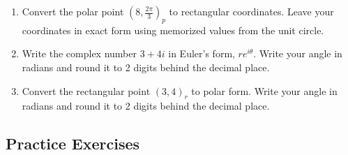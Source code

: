 \begin{myPrep}
	\begin{enumerate}
		\item Convert the polar point $\left(8,\frac{2\pi}{3}\right)_p$ to rectangular coordinates. Leave your coordinates in exact form using memorized values from the unit circle.
		\vfill
		\item Write the complex number $3+4i$ in Euler's form, $re^{i\theta}$. Write your angle in radians and round it to 2 digits behind the decimal place.
		\vfill
		\item Convert the rectangular point $(3,4)_r$ to polar form. Write your angle in radians and round it to 2 digits behind the decimal place.
		\vfill
	\end{enumerate}
\end{myPrep}
\vfill

\newpage

\subsection*{Practice Exercises} \label{practice-exercises-section-vectors}

